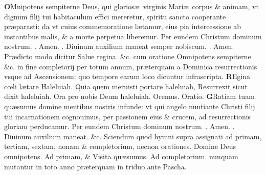 \documentclass[a5paper,10pt]{book}
\makeatletter
\DeclareRobustCommand{\Vbar}{\vers@resp{-0.1em}{V}}
\DeclareRobustCommand{\Rbar}{\vers@resp{0pt}{R}}
\newcommand{\vers@resp@sym}{\raisebox{0.2ex}{\rotatebox[origin=c]{-20}{$\m@th\rceil$}}}
\newcommand{\vers@resp}[2]{%
  {\ooalign{\hidewidth\kern#1\vers@resp@sym\hidewidth\cr#2\cr}}%
}%
\def\ae{æ}
\def\oe{œ}
\makeatother
\begin{document}
\begin{multicols*}{2}
\vspace{-.25em}
\lettrine[lines=2]{\bfseries \color{red} O}{}Mnipotens sempiterne Deus, qui glorios\ae \ virginis Mari\ae \ corpus \& animam, vt dignum filij tui habitaculum effici mereretur, spiritu sancto
cooperante pr\ae parasti: da vt cuius commemoratione l\ae tamur, eius pia intercessione ab instantibus malis, \& a morte perpetua liberemur. Per eundem Christum dominum nostrum. \color{red} \Rbar . \color{black} Amen. \Vbar . %
Diuinum auxilium maneat semper nobiscum. \color{red} \Rbar . \color{black} Amen.
\newline {} \color{red} Pr\ae dicto modo dicitur \color{black} Salue regina. \color{red} \&c. cum oratione \color{black} Omnipotens sempiterne. \&c. \color{red} in fine completorij per totum annum, pr\ae terquam a Dominica resurrectionis vsque ad Ascensionem: quo tempore earum loco dicuntur infrascripta. \color{black}
\vspace{-.25em}
\lettrine[lines=2]{\bfseries \color{red} R}{}Egina c\oe li l\ae tare Haleluiah. Quia quem meruisti portare haleluiah, Resurrexit sicut dixit haleluiah. Ora pro nobis Deum haleluiah. Oremus. \color{red} O\color{black}ratio.
\vspace{-.25em}
\lettrine[lines=2]{\bfseries \color{red} G}{}Ratiam tuam qu\ae sumus domine mentibus nostris infunde: vt qui angelo nuntiante Christi filij tui incarnationem cognouimus, per passionem eius \& crucem, ad resurrectionis gloriam perducamur. Per eundem Christum dominum nostrum. \color{red} \Rbar . \color{black} Amen. \color{red} \Vbar . \color{black} Diuinum auxilium maneat. \&c.
\newline {} \color{red} Sciendum quod hymni supra assignati ad primam, tertiam, sextam, nonam \& completorium, necnon orationes. \color{black} Domine Deus omnipotens. \color{red} Ad primam, \& \color{black} Visita qu\ae sumus. \color{red} Ad completorium. nunquam mutantur in toto anno pr\ae terquam in triduo ante Pascha. \color{black}

\end{multicols*}
\end{document}
